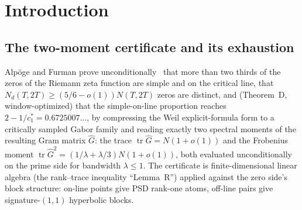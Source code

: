 \documentclass[11pt]{article}
\theoremstyle{plain}
\theoremstyle{definition}
\theoremstyle{remark}
\newcommand{\Gh}{\widehat{G}}
\newcommand{\tr}{\operatorname{tr}}
\newcommand{\Nd}{N_{d}}
\begin{document}
\begin{abstract}
The pair-interference channel, the one gap in the atom-only model theorem, is
closed by an integrality theorem throughout the admissible pair-depth family
($w \le 1$, plus deep probes at $w \in \{1.5, 2\}$): proved unconditionally for
single-pair columns to $w \le 2.8$, which covers that whole family, and for
multi-pair columns at $w \le 0.82$ ($w \le 0.98$ modulo one crowding cap whose
ledger constant is interval-certified; on the deepest sliver
$w \in (0.98, 1]$ the coverage is adversarial-numerical with the unconditional
$8/9$ backstop), with an unconditional $8/9$-strength spectral backstop at all
depths. Mixed-depth multi-pair columns involving the deep probes
$w \in \{1.5, 2\}$ rest on that backstop together with converged adversarial
pricing. The two-moment certificate, and with it the bandwidth-one ceiling, is
robust under Rudnick--Sarnak-range cubic augmentation with capacity control.
\end{abstract}

\section{Introduction}
\label{sec:intro}

\subsection{The two-moment certificate and its exhaustion}

Alp\"oge and Furman prove unconditionally~\cite{AF26} that more than two thirds
of the zeros of the Riemann zeta function are simple and on the critical line,
that $\Nd(T, 2T) \ge (5/6 - o(1)) N(T, 2T)$ zeros are distinct, and (Theorem~D,
window-optimized) that the simple-on-line proportion reaches
$2 - 1/c_1^{*} = 0.6725007\ldots$, by compressing the Weil explicit-formula form
to a critically sampled Gabor family and reading exactly two spectral moments of
the resulting Gram matrix $\Gh$: the trace $\tr \Gh = N(1 + o(1))$ and the
Frobenius moment $\tr \Gh^2 = (1/\lambda + \lambda/3) N (1 + o(1))$, both
evaluated unconditionally on the prime side for bandwidth $\lambda \le 1$. The
certificate is finite-dimensional linear algebra (the rank--trace inequality
``Lemma~R'') applied against the zero side's block structure: on-line points give
PSD rank-one atoms, off-line pairs give signature-$(1,1)$ hyperbolic blocks.
\end{document}
